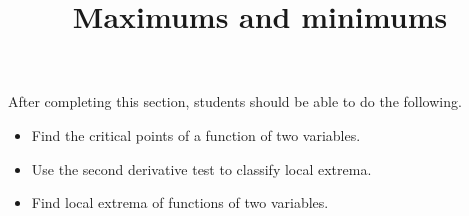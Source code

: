 \documentclass{ximera}
\title{Maximums and minimums}
\begin{document}
\begin{abstract}
\end{abstract}

\maketitle

\begin{sectionOutcomes}

  After completing this section, students should be able to do the following.

\begin{itemize}
\item Find the critical points of a function of two variables.
\item Use the second derivative test to classify local extrema.
\item Find local extrema of functions of two variables.
\end{itemize}

\end{sectionOutcomes}
\end{document}
